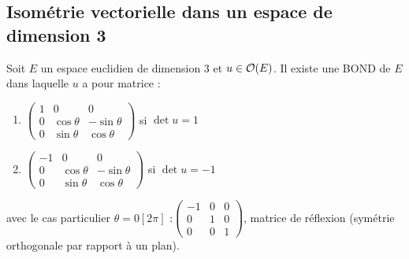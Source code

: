 \documentclass{book}
\begin{document}
\subsection{Isométrie vectorielle dans un espace de dimension 3}
\begin{Theoreme}[Réduction]
Soit $E$ un espace euclidien de dimension $3$ et $u \in \mathcal{O}(E)$. Il existe une BOND de $E$ dans
laquelle $u$ a pour matrice :
\begin{enumerate}
\item $\begin{pmatrix}1&0&0\\0& \cos \theta &-\sin \theta \\0& \sin \theta &  \cos \theta \end{pmatrix}$ si $\det u=1$
\item $\begin{pmatrix}-1&0&0\\0& \cos \theta &-\sin \theta \\0& \sin \theta &  \cos \theta \end{pmatrix}$ si $\det u=-1$
\end{enumerate}
avec le cas particulier $\theta = 0 [2\pi]$ :$\begin{pmatrix}-1&0&0\\0& 1 &0 \\0& 0 &  1 \end{pmatrix}$, matrice de réflexion (symétrie orthogonale par rapport à un plan).
\end{Theoreme}
\end{document}
